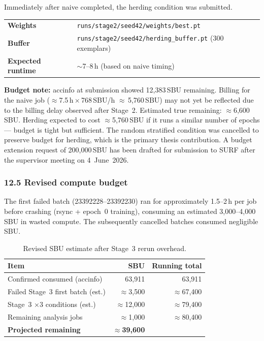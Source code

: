 Immediately after naive completed, the herding condition was submitted.

\begin{center}\small
\begin{tabular}{ll}
\hline
\textbf{Weights} & \texttt{runs/stage2/seed42/weights/best.pt} \\
\textbf{Buffer} & \texttt{runs/stage2/seed42/herding\_buffer.pt} (300 exemplars) \\
\textbf{Expected runtime} & $\sim$7--8\,h (based on naive timing) \\
\hline
\end{tabular}
\end{center}

\noindent \textbf{Budget note:} accinfo at submission showed 12,383\,SBU
remaining. Billing for the naive job ($\approx$7.5\,h\,$\times$\,768\,SBU/h
$\approx$\,5,760\,SBU) may not yet be reflected due to the billing delay
observed after Stage~2. Estimated true remaining: $\approx$6,600\,SBU.
Herding expected to cost $\approx$5,760\,SBU if it runs a similar number
of epochs — budget is tight but sufficient. The random stratified condition
was cancelled to preserve budget for herding, which is the primary thesis
contribution. A budget extension request of 200,000\,SBU has been drafted
for submission to SURF after the supervisor meeting on 4~June~2026.

\subsubsection*{12.5 Revised compute budget}

The first failed batch (23392228--23392230) ran for approximately 1.5--2\,h
per job before crashing (rsync + epoch~0 training), consuming an estimated
3,000--4,000\,SBU in wasted compute. The subsequently cancelled batches
consumed negligible SBU.

\begin{table}[h]
\centering
\caption{Revised SBU estimate after Stage~3 rerun overhead.}
\label{tab:budget_rerun}
\small
\begin{tabular}{lrr}
\hline
\textbf{Item} & \textbf{SBU} & \textbf{Running total} \\
\hline
Confirmed consumed (accinfo)      & 63,911  & 63,911 \\
Failed Stage~3 first batch (est.) & $\approx$3,500 & $\approx$67,400 \\
Stage~3 $\times$3 conditions (est.) & $\approx$12,000 & $\approx$79,400 \\
Remaining analysis jobs           & $\approx$1,000  & $\approx$80,400 \\
\hline
\textbf{Projected remaining}      & \textbf{$\approx$39,600} & \\
\hline
\end{tabular}
\end{table}

